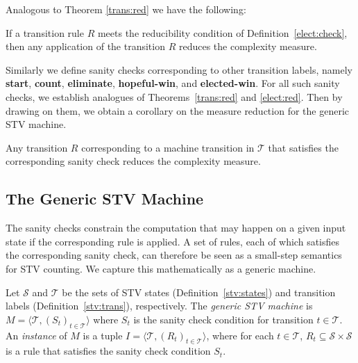 \documentclass{llncs}
\begin{document}
\noindent
Analogous to Theorem \ref{trans:red} we have the following:
\begin{theorem}\label{elect:red}
If a transition rule $R$ meets the reducibility condition of
Definition~\ref{elect:check},  
then any application of the transition $R$ reduces the complexity measure.
\end{theorem}

\noindent
Similarly we define sanity checks corresponding to other transition
labels, namely 
\textbf{start}, \textbf{count}, \textbf{eliminate},
\textbf{hopeful-win}, and \textbf{elected-win}. 
For all such sanity checks, we establish analogues of 
Theorems~\ref{trans:red} and \ref{elect:red}. Then by drawing on them, we obtain
a corollary on the measure reduction for the generic STV machine.
\begin{corollary}\label{measure:reduction}
Any transition $R$ corresponding to a machine transition in
$\mathcal{T}$ that satisfies the corresponding sanity check reduces the complexity measure.
\end{corollary}  



\subsection{The Generic STV Machine} 
The sanity checks constrain the computation that may happen on a
given input state if the corresponding rule is applied. A set of
rules, each of which satisfies the corresponding sanity check, can
therefore be seen as a small-step semantics for STV counting. We
capture this mathematically as a generic machine.

\begin{definition}
Let $\mathcal{S}$ 
and
$\mathcal{T}$
be the sets of STV states (Definition~\ref{stv:states})
and  
transition labels (Definition~\ref{stv:trans}), respectively. 
The \emph{generic
STV machine} is $M = \langle \mathcal{T}, (S_t)_{t \in \mathcal{T}}
\rangle$ where $S_t$ is the sanity check condition 
for 
transition $t \in \mathcal{T}$. 
An \emph{instance} of 
$M$
is a tuple $I = \langle \mathcal{T}, (R_t)_{t \in
\mathcal{T}} \rangle$, where for each $t \in \mathcal{T}$, $R_t
\subseteq \mathcal{S} \times \mathcal{S}$ is a rule that satisfies
the sanity check condition $S_t$. 
\end{definition}
\end{document}
